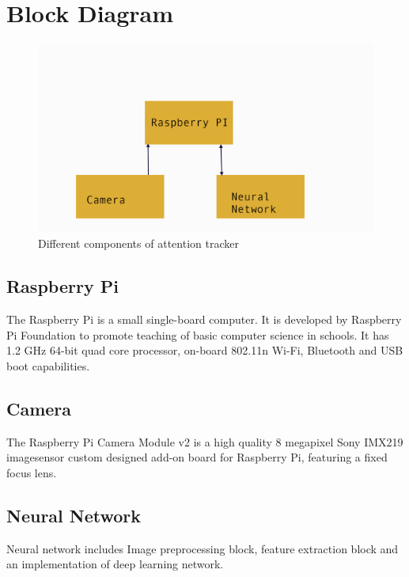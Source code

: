 \section{Block Diagram}
\begin{figure}[ht]
\centering
\includegraphics[scale=0.7]{block}
\caption{Different components of attention tracker}
\end{figure}

\subsection{Raspberry Pi}
The Raspberry Pi is a small single-board computer. It is developed by Raspberry Pi Foundation to promote teaching of basic computer science in schools. It has  1.2 GHz 64-bit quad core processor, on-board 802.11n Wi-Fi, Bluetooth and USB boot capabilities. 
\subsection{Camera}
The Raspberry Pi Camera Module v2 is a high quality 8 megapixel Sony IMX219 imagesensor custom designed add-on board for Raspberry Pi, featuring a fixed focus lens.
\subsection{Neural Network}
Neural network includes Image preprocessing block, feature extraction block and an implementation of deep learning network.

